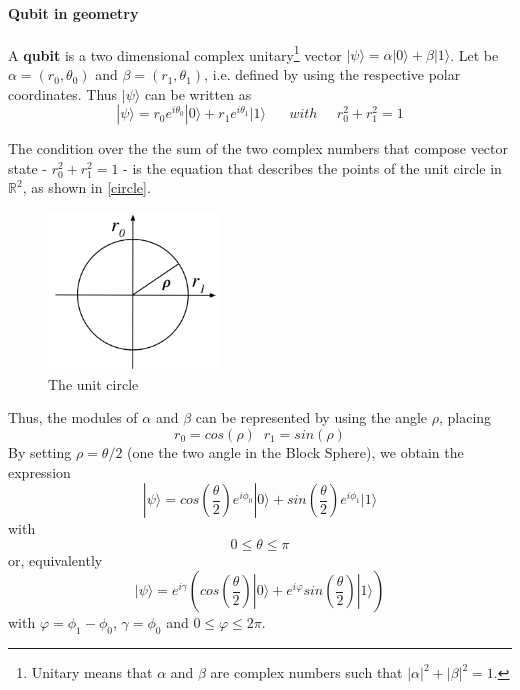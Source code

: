 \documentclass[a4paper,10pt]{article}
\begin{document}
\paragraph{Qubit in geometry} A \textbf{qubit} is a two dimensional complex unitary\footnote{Unitary means that $\alpha$ and $\beta$ are complex numbers such that $|\alpha|^2 + |\beta|^2 = 1$.} vector $|\psi\rangle = \alpha|0\rangle + \beta|1\rangle$. Let be $\alpha = (r_0, \theta_0)$ and $\beta = (r_1, \theta_1)$, i.e. defined by using the respective polar coordinates. Thus $|\psi\rangle$ can be written as
\begin{equation}
|\psi\rangle = r_0 e^{i\theta_0}|0\rangle + r_1 e^{i\theta_1}|1\rangle \; \; \; \; \; \; with \; \; \; \; \; r_0^2 + r_1^2 = 1
\label{eq:qubitPolarStep}
\end{equation}

The condition over the the sum of the two complex numbers that compose vector state - $r_0^2 + r_1^2 = 1$ - is the equation that describes the points of the unit circle in ${\mathbb{R}}^2$, as shown in \autoref{circle}.

\begin{figure}[!htb]
\begin{center}
\includegraphics[width=1.8in]{images/circle.png}
\caption{The unit circle}
\label{circle}
\end{center}
\end{figure}

Thus, the modules of $\alpha$ and $\beta$ can be represented by using the angle $\rho$, placing
$$r_0 = cos(\rho) \; \; r_1 = sin(\rho)$$
By setting $\rho = \theta/2$ (one the two angle in the Block Sphere), we obtain the expression
$$|\psi\rangle = cos\left(\frac{\theta}{2}\right) e^{i\phi_0}|0\rangle + sin\left(\frac{\theta}{2}\right) e^{i\phi_1}|1\rangle$$
with $$0 \leq \theta \leq \pi$$
or, equivalently
$$|\psi\rangle = e^{i\gamma}\left(cos\left(\frac{\theta}{2}\right)|0\rangle + e^{i\varphi}sin\left(\frac{\theta}{2}\right)|1\rangle\right)$$
with $\varphi = \phi_1 - \phi_0$, $\gamma = \phi_0$ and $0 \leq \varphi \leq 2\pi$. 
\end{document}
